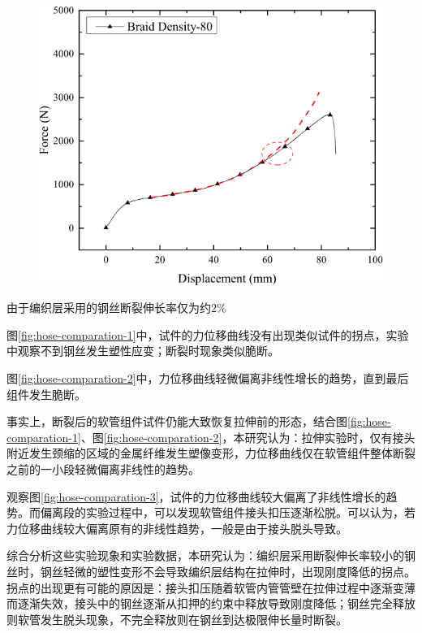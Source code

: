 \begin{figure}[!htb]
{		\includegraphics[height=0.22\textheight]{figure/chap2/plasiticity-1}
		\label{fig:hose-comparation-3}}
	\label{fig:hose-comparation}
\end{figure}




由于编织层采用的钢丝断裂伸长率仅为约$ 2\% $

图\ref{fig:hose-comparation-1}中，试件的力位移曲线没有出现类似\ha 试件的拐点，实验中观察不到钢丝发生塑性应变；断裂时现象类似脆断。

图\ref{fig:hose-comparation-2}中，力位移曲线轻微偏离非线性增长的趋势，直到最后组件发生脆断。

事实上，断裂后的软管组件试件仍能大致恢复拉伸前的形态，结合图\ref{fig:hose-comparation-1}、图\ref{fig:hose-comparation-2}，本研究认为：拉伸实验时，仅有接头附近发生颈缩的区域的金属纤维发生塑像变形，力位移曲线仅在软管组件整体断裂之前的一小段轻微偏离非线性的趋势。



观察图\ref{fig:hose-comparation-3}，试件的力位移曲线较大偏离了非线性增长的趋势。而偏离段的实验过程中，可以发现软管组件接头扣压逐渐松脱。可以认为，若力位移曲线较大偏离原有的非线性趋势，一般是由于接头脱头导致。

综合分析这些实验现象和实验数据，本研究认为：编织层采用断裂伸长率较小的钢丝时，钢丝轻微的塑性变形不会导致编织层结构在拉伸时，出现刚度降低的拐点。拐点的出现更有可能的原因是：接头扣压随着软管内管管壁在拉伸过程中逐渐变薄而逐渐失效，接头中的钢丝逐渐从扣押的约束中释放导致刚度降低；钢丝完全释放则软管发生脱头现象，不完全释放则在钢丝到达极限伸长量时断裂。



